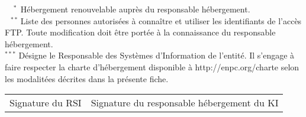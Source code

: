 \documentclass{ki019}
\begin{document}
\vspace{-0.5cm}
\noindent
$^{\phantom{**}*}$ Hébergement renouvelable auprès du responsable hébergement. \\
$^{\phantom{*}**}$ Liste des personnes autorisées à connaître et utiliser les identifiants de l'accès FTP. Toute modification doit être portée à la connaissance du responsable hébergement. \\
$^{***}$ Désigne le Responsable des Systèmes d'Information de l'entité. Il s'engage à faire respecter la charte d'hébergement disponible à http://enpc.org/charte selon les modalitées décrites dans la présente fiche.

\vspace{0.5cm}
\Large
\begin{tabular}{p{6cm}p{9.5cm}}
Signature du RSI & Signature du responsable hébergement du KI
\end{tabular}

\Footer{\today}
\end{document}
